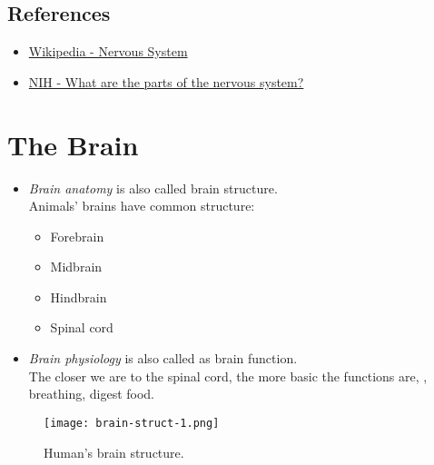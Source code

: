 \subsection{References}
\begin{itemize}
	\item \href{https://en.wikipedia.org/wiki/Nervous_system}{Wikipedia - Nervous System}
	\item \href{https://www.nichd.nih.gov/health/topics/neuro/conditioninfo/}{NIH - What are the parts of the nervous system?}
\end{itemize}

\section{The Brain}
\begin{itemize}
	\item \textit{Brain anatomy} is also called brain structure.\\
	Animals' brains have common structure:
	\begin{itemize}
		\item Forebrain
		\item Midbrain
		\item Hindbrain
		\item Spinal cord
	\end{itemize}
	\item \textit{Brain physiology} is also called as brain function.\\
	The closer we are to the spinal cord, the more basic the functions are, \eg, breathing, digest food.
\end{itemize}

\begin{figure}[hbt!]
	\centering
	\texttt{[image: brain-struct-1.png]}
	\caption{Human's brain structure.}
\end{figure}


